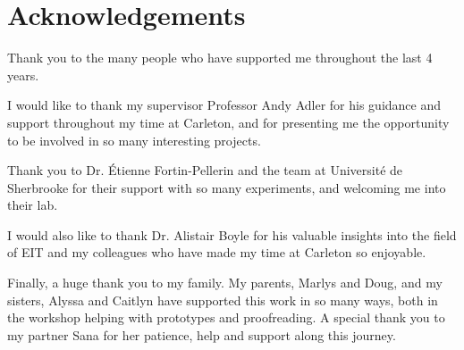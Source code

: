\thispagestyle{plain}

\section*{Acknowledgements}

Thank you to the many people who have supported me throughout the last 4 years.

\vspace{5mm}

\noindent I would like to thank my supervisor Professor Andy Adler for his 
guidance and support throughout my time at Carleton, and for presenting
me the opportunity to be involved in so many interesting projects. 

\vspace{5mm}

\noindent Thank you to Dr. \'Etienne Fortin-Pellerin and the team at Universit\'e de Sherbrooke for their 
support with so many experiments, and welcoming me into their lab.

\vspace{5mm}

\noindent I would also like to thank 
Dr. Alistair Boyle for his valuable insights into the field 
of EIT and my colleagues who have made my time at 
Carleton so enjoyable. 

\vspace{5mm}

\noindent Finally, a huge thank you to my family. 
My parents, Marlys and Doug, and my sisters, Alyssa and Caitlyn 
have supported this work in so many ways, both in the workshop helping 
with prototypes and proofreading. A special thank you to my partner Sana for 
her patience, help and support along this journey.

